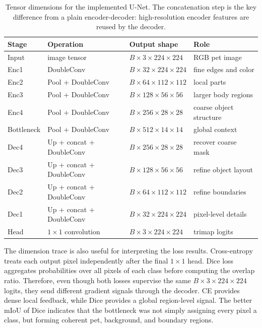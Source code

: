 \documentclass[10pt,twocolumn]{article}
\begin{document}
\begin{table}[!htbp]
\centering
\caption{Tensor dimensions for the implemented U-Net. The concatenation step is the key difference from a plain encoder-decoder: high-resolution encoder features are reused by the decoder.}
\label{tab:appendix_unet_dims}
\begin{tabular}{llll}
\toprule
Stage & Operation & Output shape & Role\\
\midrule
Input & image tensor & $B\times3\times224\times224$ & RGB pet image\\
Enc1 & DoubleConv & $B\times32\times224\times224$ & fine edges and color\\
Enc2 & Pool + DoubleConv & $B\times64\times112\times112$ & local parts\\
Enc3 & Pool + DoubleConv & $B\times128\times56\times56$ & larger body regions\\
Enc4 & Pool + DoubleConv & $B\times256\times28\times28$ & coarse object structure\\
Bottleneck & Pool + DoubleConv & $B\times512\times14\times14$ & global context\\
Dec4 & Up + concat + DoubleConv & $B\times256\times28\times28$ & recover coarse mask\\
Dec3 & Up + concat + DoubleConv & $B\times128\times56\times56$ & refine object layout\\
Dec2 & Up + concat + DoubleConv & $B\times64\times112\times112$ & refine boundaries\\
Dec1 & Up + concat + DoubleConv & $B\times32\times224\times224$ & pixel-level details\\
Head & $1\times1$ convolution & $B\times3\times224\times224$ & trimap logits\\
\bottomrule
\end{tabular}
\end{table}

The dimension trace is also useful for interpreting the loss results. Cross-entropy treats each output pixel independently after the final $1\times1$ head. Dice loss aggregates probabilities over all pixels of each class before computing the overlap ratio. Therefore, even though both losses supervise the same $B\times3\times224\times224$ logits, they send different gradient signals through the decoder. CE provides dense local feedback, while Dice provides a global region-level signal. The better mIoU of Dice indicates that the bottleneck was not simply assigning every pixel a class, but forming coherent pet, background, and boundary regions.
\end{document}

